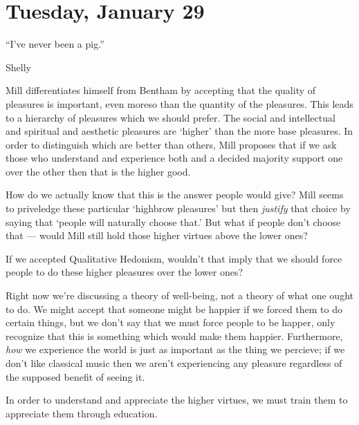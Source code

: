 
\section{Tuesday, January 29}

\epigraph{``I've never been a pig.''}{Shelly}

Mill differentiates himself from Bentham by accepting that the quality of pleasures is important, even moreso than the quantity of the pleasures. This leads to a hierarchy of pleasures which we should prefer. The social and intellectual and spiritual and aesthetic pleasures are `higher' than the more base pleasures. In order to distinguish which are better than others, Mill proposes that if we ask those who understand and experience both and a decided majority support one over the other then that is the higher good.

\begin{problem}
How do we actually know that this is the answer people would give? Mill seems to priveledge these particular `highbrow pleasures' but then \emph{justify} that choice by saying that `people will naturally choose that.' But what if people don't choose that --- would Mill still hold those higher virtues above the lower ones?
\end{problem}

\begin{problem}
If we accepted Qualitative Hedonism, wouldn't that imply that we should force people to do these higher pleasures over the lower ones?

\begin{solution}[Response]
Right now we're discussing a theory of well-being, not a theory of what one ought to do. We might accept that someone might be happier if we forced them to do certain things, but we don't say that we must force people to be happer, only recognize that this is something which would make them happier. Furthermore, \emph{how} we experience the world is just as important as the thing we percieve; if we don't like classical music then we aren't experiencing any pleasure regardless of the supposed benefit of seeing it.
\end{solution}
\end{problem}

\begin{proposition}
In order to understand and appreciate the higher virtues, we must train them to appreciate them through education.
\end{proposition}

